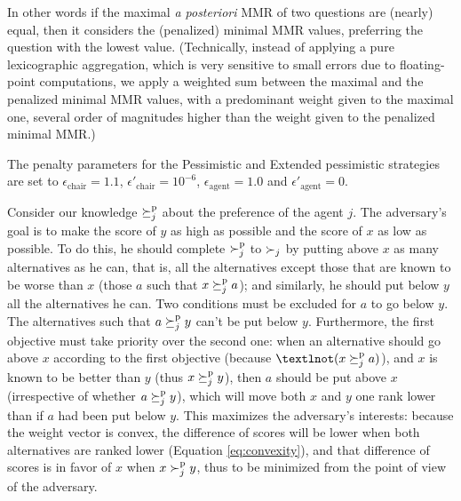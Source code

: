 \documentclass{article}
\begin{document}
\begin{details*}[Pessimistic]
	In other words if the maximal {\em a posteriori} MMR of two questions are (nearly) equal, then it considers the (penalized) minimal MMR values, preferring the question with the lowest value.
	(Technically, instead of applying a pure lexicographic aggregation, which is very sensitive to small errors due to floating-point computations, we apply a weighted sum between the maximal and the penalized minimal MMR values, with a predominant weight given to the maximal one, several order of magnitudes higher than the weight given to the penalized minimal MMR.)

The penalty parameters for the Pessimistic and Extended pessimistic strategies are set to $\epsilon_{\text{chair}} = 1.1$, $\epsilon'_{\text{chair}} = 10^{-6}$, $\epsilon_{\text{agent}} = 1.0$ and $\epsilon'_{\text{agent}} = 0$.
\end{details*}

\begin{sketch*}
	Consider our knowledge $\succeq^\text{p}_j$ about the preference of the agent $j$. 
	The adversary's goal is to make the score of $y$ as high as possible and the score of $x$ as low as possible. 
	To do this, he should complete $\succ^\text{p}_j$ to $\succ_j$ by putting above $x$ as many alternatives as he can, that is, all the alternatives except those that are known to be worse than $x$ (those $a$ such that $x \succeq^\text{p}_j a$); and similarly, he should put below $y$ all the alternatives he can. Two conditions must be excluded for $a$ to go below $y$. The alternatives such that $a \succeq^\text{p}_j y$ can’t be put below $y$.
	Furthermore, the first objective must take priority over the second one: when an alternative should go above $x$ according to the first objective (because $¬(x \pprefeq_j a)$), and $x$ is known to be better than $y$ (thus $x \succeq^\text{p}_j y$), then $a$ should be put above $x$ (irrespective of whether $a \succeq^\text{p}_j y$), which will move both $x$ and $y$ one rank lower than if $a$ had been put below $y$. 
	This maximizes the adversary’s interests: because the weight vector is convex, the difference of scores will be lower when both alternatives are ranked lower (Equation \ref{eq:convexity}), and that difference of scores is in favor of $x$ when $x \succ^\text{p}_j y$, thus to be minimized from the point of view of the adversary.
\end{sketch*}
\end{document}
